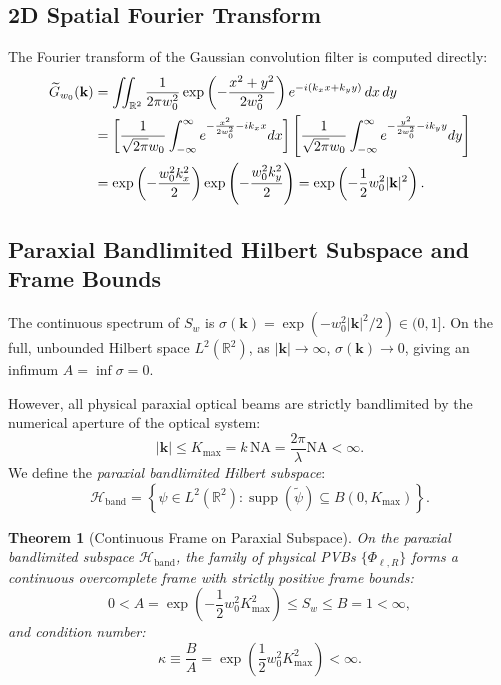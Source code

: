 \documentclass[11pt,a4paper]{article}
\newtheorem{theorem}{Theorem}
\begin{document}
\subsection{2D Spatial Fourier Transform}

The Fourier transform of the Gaussian convolution filter is computed directly:
\begin{align}
\widetilde{G}_{w_0}(\mathbf{k}) &= \iint_{\mathbb{R}^2} \frac{1}{2\pi w_0^2} \exp\left( - \frac{x^2 + y^2}{2 w_0^2} \right) e^{-i(k_x x + k_y y)} \, dx \, dy \notag \\
&= \left[ \frac{1}{\sqrt{2\pi} w_0} \int_{-\infty}^\infty e^{-\frac{x^2}{2 w_0^2} - i k_x x} dx \right] \left[ \frac{1}{\sqrt{2\pi} w_0} \int_{-\infty}^\infty e^{-\frac{y^2}{2 w_0^2} - i k_y y} dy \right] \notag \\
&= \exp\left( - \frac{w_0^2 k_x^2}{2} \right) \exp\left( - \frac{w_0^2 k_y^2}{2} \right) = \exp\left( - \frac{1}{2} w_0^2 |\mathbf{k}|^2 \right).
\label{eq:fourier_kernel}
\end{align}

\subsection{Paraxial Bandlimited Hilbert Subspace and Frame Bounds}

The continuous spectrum of $S_w$ is $\sigma(\mathbf{k}) = \exp(-w_0^2 |\mathbf{k}|^2 / 2) \in (0, 1]$. On the full, unbounded Hilbert space $L^2(\mathbb{R}^2)$, as $|\mathbf{k}| \to \infty$, $\sigma(\mathbf{k}) \to 0$, giving an infimum $A = \inf \sigma = 0$.

However, all physical paraxial optical beams are strictly bandlimited by the numerical aperture of the optical system:
\begin{equation}
|\mathbf{k}| \le K_{\max} = k \, \text{NA} = \frac{2\pi}{\lambda} \text{NA} < \infty.
\label{eq:kmax_na}
\end{equation}
We define the \emph{paraxial bandlimited Hilbert subspace}:
\begin{equation}
\mathcal{H}_{\text{band}} = \left\{ \psi \in L^2(\mathbb{R}^2) : \operatorname{supp}(\widetilde{\psi}) \subseteq B(0, K_{\max}) \right\}.
\label{eq:h_band_def}
\end{equation}

\begin{theorem}[Continuous Frame on Paraxial Subspace]
\label{thm:frame_bounds}
On the paraxial bandlimited subspace $\mathcal{H}_{\text{band}}$, the family of physical PVBs $\{\Phi_{\ell, R}\}$ forms a continuous overcomplete frame with strictly positive frame bounds:
\begin{equation}
\boxed{0 < A = \exp\left( - \frac{1}{2} w_0^2 K_{\max}^2 \right) \le S_w \le B = 1 < \infty,}
\label{eq:thm3_frame_bounds}
\end{equation}
and condition number:
\begin{equation}
\kappa \equiv \frac{B}{A} = \exp\left( \frac{1}{2} w_0^2 K_{\max}^2 \right) < \infty.
\label{eq:thm3_condition_number}
\end{equation}
\end{theorem}
\end{document}
